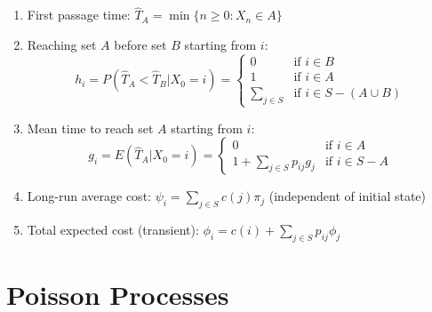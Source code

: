 \documentclass[11pt,a4paper]{article}
\begin{document}
\begin{enumerate}[resume]
\item First passage time: $\hat{T}_A = \min \{ n \geq 0 : X_n \in A \}$

\item Reaching set $A$ before set $B$ starting from $i$: \[
h_i = P(\hat{T}_A < \hat{T}_B | X_0=i) = \begin{cases}
0 &\text{if } i \in B \\
1 &\text{if } i \in A \\
\sum_{j \in S} &\text{if } i \in S-(A \cup B)
\end{cases}
\]

\item Mean time to reach set $A$ starting from $i$: \[
g_i = E(\hat{T}_A | X_0=i) = \begin{cases}
0 &\text{if } i \in A \\
1 + \sum_{j \in S} p_{ij} g_j &\text{if } i \in S-A
\end{cases}
\]

\item Long-run average cost: $\psi_i = \sum_{j \in S} c(j) \pi_j$ (independent of initial state)

\item Total expected cost (transient): $\phi_i = c(i) + \sum_{j \in S} p_{ij} \phi_j$
\end{enumerate}

\section*{Poisson Processes}
\end{document}
